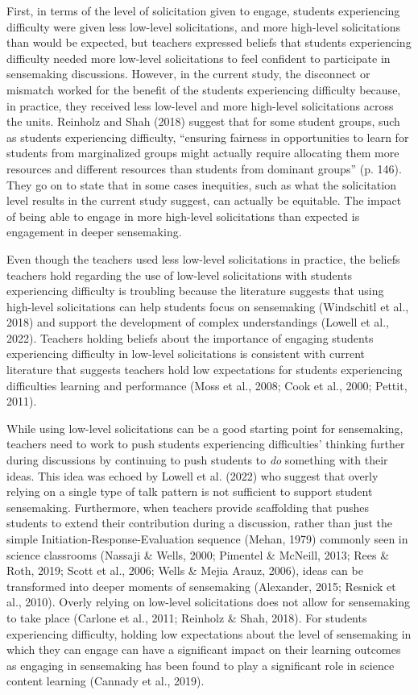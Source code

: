 \documentclass{sig-alternate} %
\begin{document}
\begin{large}
First, in terms of the level of solicitation given to engage, students experiencing difficulty were given less low-level solicitations, and more high-level solicitations than would be expected, but teachers expressed beliefs that students experiencing difficulty needed more low-level solicitations to feel confident to participate in sensemaking discussions. However, in the current study, the disconnect or mismatch worked for the benefit of the students experiencing difficulty because, in practice, they received less low-level and more high-level solicitations across the units. Reinholz and Shah (2018) suggest that for some student groups, such as students experiencing difficulty, “ensuring fairness in opportunities to learn for students from marginalized groups might actually require allocating them more resources and different resources than students from dominant groups” (p. 146). They go on to state that in some cases inequities, such as what the solicitation level results in the current study suggest, can actually be equitable. The impact of being able to engage in more high-level solicitations than expected is engagement in deeper sensemaking. 

Even though the teachers used less low-level solicitations in practice, the beliefs teachers hold regarding the use of low-level solicitations with students experiencing difficulty is troubling because the literature suggests that using high-level solicitations can help students focus on sensemaking (Windschitl et al., 2018) and support the development of complex understandings (Lowell et al., 2022). Teachers holding beliefs about the importance of engaging students experiencing difficulty in low-level solicitations is consistent with current literature that suggests teachers hold low expectations for students experiencing difficulties learning and performance (Moss et al., 2008; Cook et al., 2000; Pettit, 2011). 

While using low-level solicitations can be a good starting point for sensemaking, teachers need to work to push students experiencing difficulties’ thinking further during discussions by continuing to push students to \textit{do} something with their ideas. This idea was echoed by Lowell et al. (2022) who suggest that overly relying on a single type of talk pattern is not sufficient to support student sensemaking. Furthermore, when teachers provide scaffolding that pushes students to extend their contribution during a discussion, rather than just the simple Initiation-Response-Evaluation sequence (Mehan, 1979) commonly seen in science classrooms (Nassaji \& Wells, 2000; Pimentel \& McNeill, 2013; Rees \& Roth, 2019; Scott et al., 2006; Wells \& Mejia Arauz, 2006), ideas can be transformed into deeper moments of sensemaking (Alexander, 2015; Resnick et al., 2010). Overly relying on low-level solicitations does not allow for sensemaking to take place (Carlone et al., 2011; Reinholz \& Shah, 2018). For students experiencing difficulty, holding low expectations about the level of sensemaking in which they can engage can have a significant impact on their learning outcomes as engaging in sensemaking has been found to play a significant role in science content learning (Cannady et al., 2019). 


\end{large}
\end{document}
